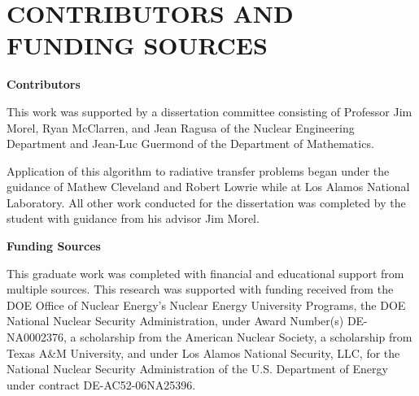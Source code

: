 %
%
%


\chapter*{CONTRIBUTORS AND FUNDING SOURCES}

\noindent \textbf{Contributors}

This work was supported by a dissertation committee consisting of Professor Jim Morel, Ryan McClarren, and Jean Ragusa of the Nuclear Engineering Department and Jean-Luc Guermond of the Department of Mathematics.

Application of this algorithm to radiative transfer problems began under the guidance of Mathew Cleveland and Robert Lowrie while at Los Alamos National Laboratory.
All other work conducted for the dissertation was completed by the student with guidance from his advisor Jim Morel.

\noindent \textbf{Funding Sources}

This graduate work was completed with financial and educational support from multiple sources.  This research was supported with funding received from the DOE Office of Nuclear
Energy's Nuclear Energy University Programs, the DOE National
Nuclear Security Administration, under Award Number(s) DE-NA0002376, a scholarship from the American Nuclear Society, a scholarship from Texas A\&M University, and under Los Alamos National Security,
LLC, for the National Nuclear Security Administration of the U.S. Department of
Energy under contract DE-AC52-06NA25396. 

\pagebreak{}
